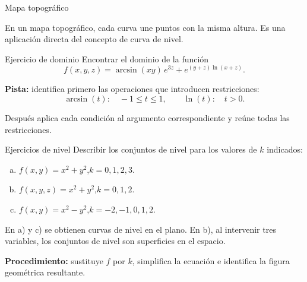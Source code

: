 \begin{frame}{Mapa topográfico}
\begin{center}
\small En un mapa topográfico, cada curva une puntos con la misma altura. Es una aplicación directa del concepto de curva de nivel.
\end{center}
\end{frame}

\begin{frame}{Ejercicio de dominio}
Encontrar el dominio de la función
\[
f(x,y,z)=\arcsin(xy)\,e^{3z}+e^{(y+z)\ln(x+z)}.
\]
\medskip

\textbf{Pista:} identifica primero las operaciones que introducen restricciones:
\[
\arcsin(t):\quad -1\leq t\leq1,
\qquad
\ln(t):\quad t>0.
\]
\medskip

Después aplica cada condición al argumento correspondiente y reúne todas las restricciones.
\end{frame}

\begin{frame}{Ejercicios de nivel}
Describir los conjuntos de nivel para los valores de $k$ indicados:
\begin{enumerate}[a)]
\item $f(x,y)=x^2+y^2$,\quad $k=0,1,2,3$.
\item $f(x,y,z)=x^2+y^2$,\quad $k=0,1,2$.
\item $f(x,y)=x^2-y^2$,\quad $k=-2,-1,0,1,2$.
\end{enumerate}
\medskip

En a) y c) se obtienen curvas de nivel en el plano. En b), al intervenir tres variables, los conjuntos de nivel son superficies en el espacio.
\medskip

\textbf{Procedimiento:} sustituye $f$ por $k$, simplifica la ecuación e identifica la figura geométrica resultante.
\end{frame}


